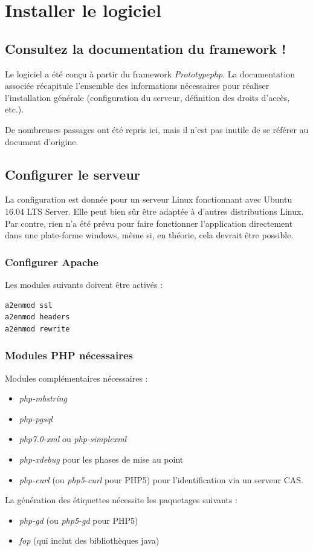 \chapter{Installer le logiciel}

\section{Consultez la documentation du framework !}

Le logiciel a été conçu à partir du framework \textit{Prototypephp}. La documentation associée \cite{pphp-doc} récapitule l'ensemble des informations nécessaires pour réaliser l'installation générale (configuration du serveur, définition des droits d'accès, etc.).

De nombreuses passages ont été repris ici, mais il n'est pas inutile de se référer au document d'origine. 

\section{Configurer le serveur}
La configuration est donnée pour un serveur Linux fonctionnant avec Ubuntu 16.04 LTS Server. Elle peut bien sûr être adaptée à d'autres distributions Linux. Par contre, rien n'a été prévu pour faire fonctionner l'application directement dans une plate-forme windows, même si, en théorie, cela devrait être possible.

\subsection{Configurer Apache}
Les modules suivants doivent être activés :
\begin{lstlisting}
a2enmod ssl
a2enmod headers
a2enmod rewrite
\end{lstlisting}
\subsection{Modules PHP nécessaires}
Modules complémentaires nécessaires :
\begin{itemize}
\item \textit{php-mbstring}
\item \textit{php-pgsql}
\item \textit{php7.0-xml} ou \textit{php-simplexml}
\item \textit{php-xdebug} pour les phases de mise au point
\item \textit{php-curl} (ou \textit{php5-curl} pour PHP5) pour l'identification via un serveur CAS.
\end{itemize}
La génération des étiquettes nécessite les paquetages suivants :
\begin{itemize}
\item \textit{php-gd} (ou \textit{php5-gd} pour PHP5)
\item \textit{fop} (qui inclut des bibliothèques java)
\end{itemize}

